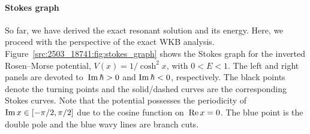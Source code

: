 \paragraph{Stokes graph}\label{src:2503_18741:sec:rm_stokes}
So far, we have derived the exact resonant solution and its energy.
Here, we proceed with the perspective of the exact WKB analysis.
Figure~\ref{src:2503_18741:fig:stokes_graph} shows the Stokes graph for the inverted Rosen--Morse potential, $V(x)=1/\cosh^2x$, with $0<E<1$.
The left and right panels are devoted to~$\operatorname{Im}\hbar>0$ and $\operatorname{Im}\hbar<0$, respectively.
The black points denote the turning points and the solid/dashed curves are the corresponding Stokes curves.
Note that the potential possesses the periodicity of~$\operatorname{Im} x\in[-\pi/2,\pi/2]$ due to the cosine function on~$\operatorname{Re} x=0$.
The blue point is the double pole and the blue wavy lines are branch cuts.

